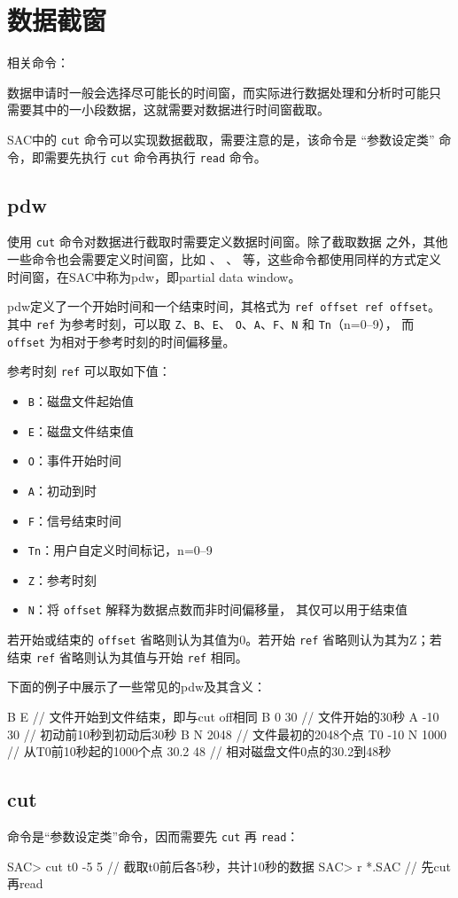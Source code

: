 \section{数据截窗}
相关命令：

数据申请时一般会选择尽可能长的时间窗，而实际进行数据处理和分析时可能只
需要其中的一小段数据，这就需要对数据进行时间窗截取。

SAC中的 \texttt{cut} 命令可以实现数据截取，需要注意的是，该命令是
``参数设定类'' 命令，即需要先执行 \texttt{cut} 命令再执行
\texttt{read} 命令。

\subsection{pdw}
\label{subsec:pdw}
使用 \texttt{cut} 命令对数据进行截取时需要定义数据时间窗。除了截取数据
之外，其他一些命令也会需要定义时间窗，比如 、
、 等，这些命令都使用同样的方式定义
时间窗，在SAC中称为pdw，即partial data window。

pdw定义了一个开始时间和一个结束时间，其格式为 \texttt{ref offset ref offset}。
其中 \texttt{ref} 为参考时刻，可以取 \texttt{Z}、\texttt{B}、\texttt{E}、
\texttt{O}、\texttt{A}、\texttt{F}、\texttt{N} 和 \texttt{Tn}（n=0--9），
而 \texttt{offset} 为相对于参考时刻的时间偏移量。

参考时刻 \texttt{ref} 可以取如下值：
\begin{itemize}
\item \texttt{B}：磁盘文件起始值
\item \texttt{E}：磁盘文件结束值
\item \texttt{O}：事件开始时间
\item \texttt{A}：初动到时
\item \texttt{F}：信号结束时间
\item \texttt{Tn}：用户自定义时间标记，n=0--9
\item \texttt{Z}：参考时刻
\item \texttt{N}：将 \texttt{offset} 解释为数据点数而非时间偏移量，
    其仅可以用于结束值
\end{itemize}

若开始或结束的 \texttt{offset} 省略则认为其值为0。若开始 \texttt{ref}
省略则认为其为Z；若结束 \texttt{ref} 省略则认为其值与开始 \texttt{ref}
相同。

下面的例子中展示了一些常见的pdw及其含义：
\begin{SACCode}
 B E            // 文件开始到文件结束，即与cut off相同
 B 0 30         // 文件开始的30秒
 A -10 30       // 初动前10秒到初动后30秒
 B N 2048       // 文件最初的2048个点
 T0 -10 N 1000  // 从T0前10秒起的1000个点
 30.2 48        // 相对磁盘文件0点的30.2到48秒
\end{SACCode}

\subsection{cut}
 命令是``参数设定类''命令，因而需要先 \texttt{cut} 再
\texttt{read}：
\begin{SACCode}
SAC> cut t0 -5 5        // 截取t0前后各5秒，共计10秒的数据
SAC> r *.SAC            // 先cut再read
\end{SACCode}
